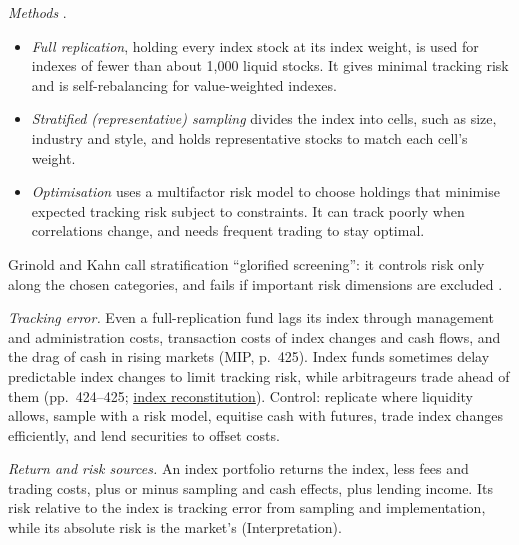 \begin{qfmethod}\label{meth:index-equity-portfolio-construction}
 \emph{Methods} \citep[chap.~7, sec.~4.2.1, pp.~425--426]{managing-investment-portfolios-2007}.
\begin{itemize}
\item \emph{Full replication}, holding every index stock at its index weight, is used for indexes of fewer than about 1{,}000 liquid stocks. It gives minimal tracking risk and is self-rebalancing for value-weighted indexes.
\item \emph{Stratified (representative) sampling} divides the index into cells, such as size, industry and style, and holds representative stocks to match each cell's weight.
\item \emph{Optimisation} uses a multifactor risk model to choose holdings that minimise expected tracking risk subject to constraints. It can track poorly when correlations change, and needs frequent trading to stay optimal.
\end{itemize}
Grinold and Kahn call stratification ``glorified screening'': it controls risk only along the chosen categories, and fails if important risk dimensions are excluded \citep[chap.~14, pp.~394--395]{alpha-grinold}.

\emph{Tracking error.} Even a full-replication fund lags its index through management and administration costs, transaction costs of index changes and cash flows, and the drag of cash in rising markets (MIP, p.~425). Index funds sometimes delay predictable index changes to limit tracking risk, while arbitrageurs trade ahead of them (pp.~424--425; \hyperref[ev:index-reconstitution-impact]{index reconstitution}). Control: replicate where liquidity allows, sample with a risk model, equitise cash with futures, trade index changes efficiently, and lend securities to offset costs.

\emph{Return and risk sources.} An index portfolio returns the index, less fees and trading costs, plus or minus sampling and cash effects, plus lending income. Its risk relative to the index is tracking error from sampling and implementation, while its absolute risk is the market's (Interpretation).


\end{qfmethod}

